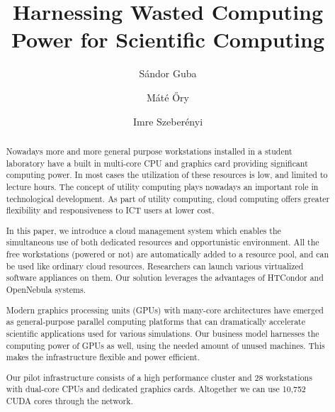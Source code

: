 \documentclass{llncs}
\begin{document}
%
\mainmatter              %
%
\title{Harnessing Wasted Computing Power for
Scientific Computing}
%
%
\author{S\'andor Guba \and M\'at\'e \H{O}ry \and Imre Szeber\'enyi}
%
%
%

\maketitle              %

\begin{abstract}

Nowadays more and more general purpose workstations installed in a student laboratory have a built in multi-core CPU and graphics card providing significant computing power. In most cases the utilization of these resources is low, and limited to lecture hours. The concept of utility computing plays nowadays an important role in technological development. As part of utility computing, cloud computing offers greater flexibility and responsiveness to ICT users at lower cost.

In  this paper, we introduce a cloud management system which enables the simultaneous use of both dedicated resources and opportunistic environment. All the free workstations (powered or not) are automatically added to a resource pool, and can be used like ordinary cloud resources. Researchers can launch various virtualized software appliances on them. Our solution leverages the advantages of HTCondor and OpenNebula systems.

Modern graphics processing units (GPUs) with many-core architectures have emerged as general-purpose parallel computing platforms that can dramatically accelerate  scientific applications used for various simulations. Our business model harnesses the computing power of GPUs as well, using the needed amount of unused machines. This makes the infrastructure flexible and power efficient.

Our pilot infrastructure consists of a high performance cluster and 28 workstations with dual-core CPUs and dedicated graphics cards. Altogether we can use 10,752 CUDA cores through the network.


\end{abstract}
%
\end{document}
